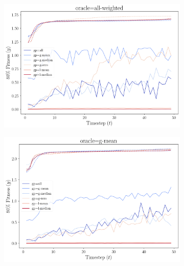 \documentclass{article}
\begin{document}
\begin{figure}[htbp]
  \centering
  \begin{subfigure}[b]{0.49\linewidth}
    \centering
    \includegraphics[width=\linewidth]{figures/pred_vs_gt_fitness_explored(all).png}
  \end{subfigure}
  \hfill
  \begin{subfigure}[b]{0.49\linewidth}
    \centering
    \includegraphics[width=\linewidth]{figures/pred_vs_gt_fitness_explored(mean).png}
  \end{subfigure}
  \vspace{2mm}
  \begin{subfigure}[b]{0.49\linewidth}
    \centering

\end{subfigure}
\end{figure}
\end{document}
